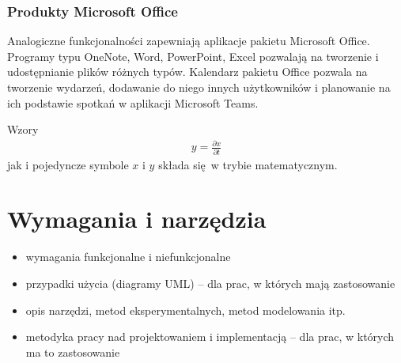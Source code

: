 \documentclass[a4paper,twoside,12pt]{book}
\newtheorem{Definition}{Definicja}
\newtheorem{Example}{Przykład}
\newtheorem{Theorem}{Twierdzenie}
\begin{document}
\subsection{Produkty Microsoft Office}
Analogiczne funkcjonalności zapewniają aplikacje pakietu Microsoft Office. Programy typu OneNote, Word, PowerPoint, Excel pozwalają na tworzenie i udostępnianie plików różnych typów. Kalendarz pakietu Office pozwala na tworzenie wydarzeń, dodawanie do niego innych użytkowników i planowanie na ich podstawie spotkań w aplikacji Microsoft Teams.


Wzory  
\begin{align}
y = \frac{\partial x}{\partial t}
\end{align}
jak i pojedyncze symbole $x$ i $y$  składa się w trybie matematycznym.


%
%





\chapter{Wymagania i narzędzia}
\label{ch:wymagania-i-narzedzia}

\begin{itemize}
\item wymagania funkcjonalne i niefunkcjonalne
\item przypadki użycia (diagramy UML) -- dla prac, w których mają zastosowanie
\item opis narzędzi, metod eksperymentalnych, metod modelowania itp.
\item metodyka pracy nad projektowaniem i implementacją -- dla prac, w których ma to zastosowanie
\end{itemize}
\end{document}
